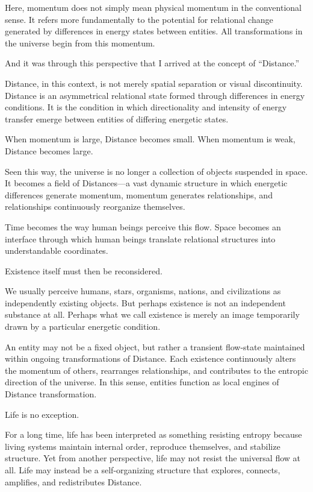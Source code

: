 \documentclass[11pt]{article}
\begin{document}
Here, momentum does not simply mean physical momentum in the conventional sense. It refers more fundamentally to the potential for relational change generated by differences in energy states between entities. All transformations in the universe begin from this momentum.

And it was through this perspective that I arrived at the concept of ``Distance.''

Distance, in this context, is not merely spatial separation or visual discontinuity. Distance is an asymmetrical relational state formed through differences in energy conditions. It is the condition in which directionality and intensity of energy transfer emerge between entities of differing energetic states.

When momentum is large, Distance becomes small.
When momentum is weak, Distance becomes large.

Seen this way, the universe is no longer a collection of objects suspended in space. It becomes a field of Distances---a vast dynamic structure in which energetic differences generate momentum, momentum generates relationships, and relationships continuously reorganize themselves.

Time becomes the way human beings perceive this flow.
Space becomes an interface through which human beings translate relational structures into understandable coordinates.

Existence itself must then be reconsidered.

We usually perceive humans, stars, organisms, nations, and civilizations as independently existing objects. But perhaps existence is not an independent substance at all. Perhaps what we call existence is merely an image temporarily drawn by a particular energetic condition.

An entity may not be a fixed object, but rather a transient flow-state maintained within ongoing transformations of Distance. Each existence continuously alters the momentum of others, rearranges relationships, and contributes to the entropic direction of the universe. In this sense, entities function as local engines of Distance transformation.

Life is no exception.

For a long time, life has been interpreted as something resisting entropy because living systems maintain internal order, reproduce themselves, and stabilize structure. Yet from another perspective, life may not resist the universal flow at all. Life may instead be a self-organizing structure that explores, connects, amplifies, and redistributes Distance.
\end{document}
